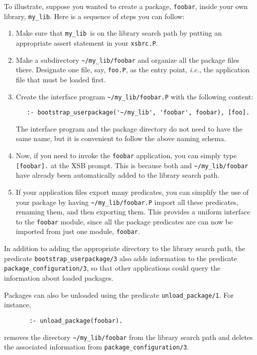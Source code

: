 To illustrate, suppose you wanted to create a package, {\tt foobar}, inside
your own library, {\tt my\_lib}. Here is a sequence of steps you can
follow:  
\begin{enumerate}
\item Make sure that {\tt my\_lib}\ is on the library search path by putting
  an appropriate assert statement in your {\tt xsbrc.P}.
\item Make a subdirectory \verb|~/my_lib/foobar| and organize all the
  package files there. Designate one file, say, {\tt foo.P}, as the
  entry point, {\it i.e.}, the application file that must be loaded first.
\item Create the interface program \verb|~/my_lib/foobar.P| with the
  following content:
    \begin{verbatim}
   :- bootstrap_userpackage('~/my_lib', 'foobar', foobar), [foo].
    \end{verbatim}
  The interface program and the package directory do not need to have the
  same name, but it is convenient to follow the above naming schema.
\item Now, if you need to invoke the {\tt foobar} application, you can
  simply type \verb|[foobar].| at the XSB prompt. This is because both and
  \verb|~/my_lib/foobar| have already been automatically added to the
  library search path.
\item If your application files export many predicates, you can simplify
  the use of your package by having \verb|~/my_lib/foobar.P| import all
  these predicates, renaming them, and then exporting them. This provides a
  uniform interface to the {\tt foobar} module, since all the package
  predicates are can now be imported from just one module, {\tt foobar}.
\end{enumerate}
In addition to adding the appropriate directory to the library search
path, the predicate \verb|bootstrap_userpackage/3| also adds
information to the predicate \verb|package_configuration/3|, so that
other applications could query the information about loaded packages.

Packages can also be unloaded using the predicate
\verb|unload_package/1|. For instance, 

\begin{verbatim}
       :- unload_package(foobar).  
\end{verbatim}
removes the directory \verb|~/my_lib/foobar| from the library search path
and deletes the associated information from \verb|package_configuration/3|.


